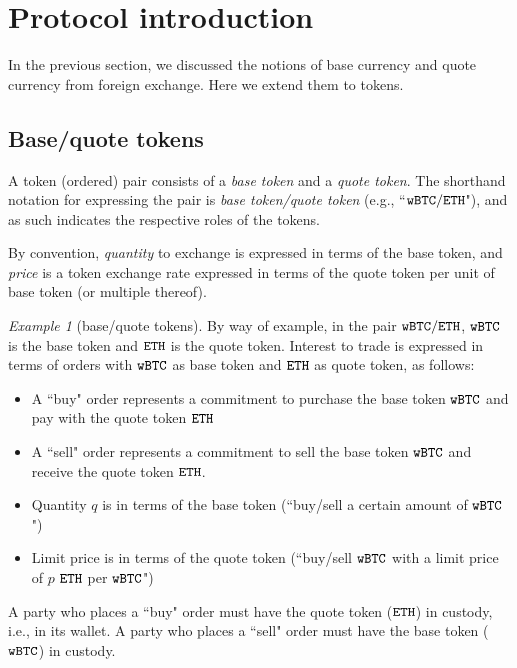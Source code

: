 \documentclass[11pt, reqno]{amsart}
\theoremstyle{definition}
\theoremstyle{remark}
\newtheorem{exmp}{Example}[subsection]
\newcommand{\BTC}{\textnormal{\texttt{wBTC}}}
\newcommand{\ETH}{\textnormal{\texttt{ETH}}}
\begin{document}

\section{Protocol introduction}
In the previous section, we discussed the notions of base currency and
quote currency from foreign exchange. Here we extend them to tokens.

\subsection{Base/quote tokens}
A token (ordered) pair consists of a \emph{base token} and a
\emph{quote token}. The shorthand notation for expressing the pair is
\emph{base token/quote token} (e.g., ``$\BTC/\ETH$"), and as such indicates the
respective roles of the tokens.

By convention, \emph{quantity} to exchange is expressed in terms of the base
token, and \emph{price} is a token exchange rate expressed in terms of the
quote token per unit of base token (or multiple thereof).

\begin{exmp}[base/quote tokens]
By way of example, in the pair $\BTC/\ETH$, $\BTC$ is the base token and $\ETH$
is the quote token. Interest to trade is expressed in terms of orders
with $\BTC$ as base token and $\ETH$ as quote token, as follows:
\begin{itemize}
	\item A ``buy" order represents a commitment to purchase the base token
        $\BTC$ and pay with the quote token $\ETH$
	\item A ``sell" order represents a commitment to sell the base token
	      $\BTC$ and receive the quote token $\ETH$.
	\item Quantity $q$ is in terms of the base token (``buy/sell a certain
	      amount of $\BTC$")
	\item Limit price is in terms of the quote token (``buy/sell $\BTC$ with a
	      limit price of $p$ $\ETH$ per $\BTC$")
\end{itemize}
A party who places a ``buy" order must have the quote token ($\ETH$) in custody,
i.e., in its wallet. A party who places a ``sell" order must have the base
token ($\BTC$) in custody.
\end{exmp}
\end{document}
